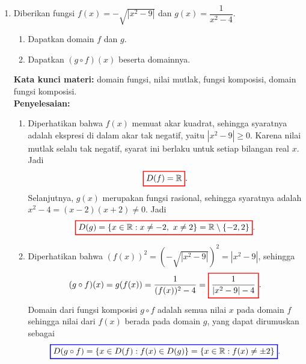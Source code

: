 \documentclass[10pt,openany,a4paper]{article}
\theoremstyle{definition}
\theoremstyle{definition}
\theoremstyle{plain}
\newenvironment{jawab}[2][tes]{%
\par\noindent\textbf{Kata kunci materi:} #1.\\
\textbf{Penyelesaian:} #2%
}{}
\begin{document}
\begin{enumerate}
    \item Diberikan fungsi $f(x)=-\sqrt{|x^2-9|}$ dan $g(x)=\dfrac{1}{x^2-4}$.
    \begin{enumerate}
        \item Dapatkan domain $f$ dan $g$.
        \item Dapatkan $(g\circ f)(x)$ beserta domainnya.
    \end{enumerate}
    \begin{jawab}[domain fungsi, nilai mutlak, fungsi komposisi, domain fungsi komposisi]{
        \begin{enumerate}
            \item Diperhatikan bahwa $f(x)$ memuat akar kuadrat, sehingga syaratnya adalah ekspresi di dalam akar tak negatif, yaitu $|x^2-9|\geq 0$. Karena nilai mutlak selalu tak negatif, syarat ini berlaku untuk setiap bilangan real $x$. Jadi
            \begin{align*}
                \colorlet{oldcolor}{.}
        \color{red}
        \setlength{\fboxrule}{1pt} \boxed{\color{oldcolor}D(f)=\mathbb{R}}\color{oldcolor}.
            \end{align*}
            Selanjutnya, $g(x)$ merupakan fungsi rasional, sehingga syaratnya adalah $x^2-4=(x-2)(x+2)\neq 0$. Jadi
            \begin{align*}
                \colorlet{oldcolor}{.}
        \color{red}
        \setlength{\fboxrule}{1pt} \boxed{\color{oldcolor}D(g)=\{x\in\mathbb{R} : x\neq -2,~x\neq 2\}=\mathbb{R}\setminus\{-2,2\}}\color{oldcolor}.
            \end{align*}
            \item Diperhatikan bahwa $(f(x))^2 = \left(-\sqrt{|x^2-9|}\right)^2 = |x^2-9|$, sehingga
            \begin{align*}
                (g\circ f)(x) = g(f(x)) = \frac{1}{(f(x))^2-4} = \colorlet{oldcolor}{.}
        \color{red}
        \setlength{\fboxrule}{1pt} \boxed{\color{oldcolor}\frac{1}{|x^2-9|-4}}\color{oldcolor}.
            \end{align*}
            Domain dari fungsi komposisi $g\circ f$ adalah semua nilai $x$ pada domain $f$ sehingga nilai dari $f(x)$ berada pada domain $g$, yang dapat dirumuskan sebagai
            \begin{align*}
                \colorlet{oldcolor}{.}
        \color{blue}
        \setlength{\fboxrule}{1pt} \boxed{\color{oldcolor}D(g\circ f) = \{x \in D(f) : f(x) \in D(g)\} = \{x \in \mathbb{R} : f(x) \neq \pm 2\}}\color{oldcolor}.
            \end{align*}

\end{enumerate}}
\end{jawab}
\end{enumerate}
\end{document}
